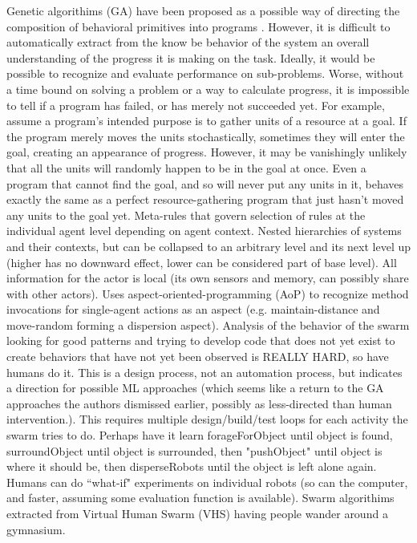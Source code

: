 \documentclass[]{article}
\begin{document}
Genetic algorithims (GA) have been proposed as a possible way of directing the composition of behavioral primitives into programs \cite{palmer2005emergence}.
However, it is difficult to automatically extract from the know be behavior of the system an overall understanding of the progress it is making on the task. 
Ideally, it would be possible to recognize and evaluate performance on sub-problems. 
Worse, without a time bound on solving a problem or a way to calculate progress, it is impossible to tell if a program has failed, or has merely not succeeded yet.
For example, assume a program's intended purpose is to gather units of a resource at a goal. 
If the program merely moves the units stochastically, sometimes they will enter the goal, creating an appearance of progress. 
However, it may be vanishingly unlikely that all the units will randomly happen to be in the goal at once. 
Even a program that cannot find the goal, and so will never put any units in it, behaves exactly the same as a perfect resource-gathering program that just hasn't moved any units to the goal yet. 
Meta-rules that govern selection of rules at the individual agent level depending on agent context. 
Nested hierarchies of systems and their contexts, but can be collapsed to an arbitrary level and its next level up (higher has no downward effect, lower can be considered part of base level). 
All information for the actor is local (its own sensors and memory, can possibly share with other actors). 
Uses aspect-oriented-programming (AoP) to recognize method invocations for single-agent actions as an aspect (e.g. maintain-distance and move-random forming a dispersion aspect).
Analysis of the behavior of the swarm looking for good patterns and trying to develop code that does not yet exist to create behaviors that have not yet been observed is REALLY HARD, so have humans do it. 
This is a design process, not an automation process, but indicates a direction for possible ML approaches (which seems like a return to the GA approaches the authors dismissed earlier, possibly as less-directed than human intervention.). 
This requires multiple design/build/test loops for each activity the swarm tries to do.
Perhaps have it learn forageForObject until object is found, surroundObject until object is surrounded, then "pushObject" until object is where it should be, then disperseRobots until the object is left alone again. 
Humans can do ``what-if" experiments on individual robots (so can the computer, and faster, assuming some evaluation function is available). 
Swarm algorithims extracted from Virtual Human Swarm (VHS) having people wander around a gymnasium. 
\end{document}
